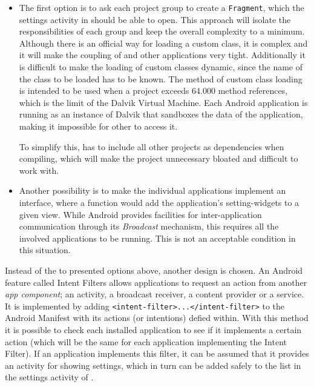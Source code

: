 \begin{itemize}
\item 
The first option is to ask each project group to create a \lstinline|Fragment|, which the settings activity in \launcher should be able to open.
This approach will isolate the responsibilities of each group and keep the overall complexity to a minimum.
Although there is an official way for loading a custom class\cite{customClassLoading}, it is complex and it will make the coupling of \launcher and other applications very tight.
Additionally it is difficult to make the loading of custom classes dynamic, since the name of the class to be loaded has to be known.
The method of custom class loading is intended to be used when a project exceeds 64.000 method references, which is the limit of the Dalvik Virtual Machine.
Each Android application is running as an instance of Dalvik that sandboxes the data of the application, making it impossible for other to access it.

To simplify this, \launcher has to include all other projects as dependencies when compiling, which will make the \launcher project unnecessary bloated and difficult to work with.

\item
Another possibility is to make the individual applications implement an interface, where a function would add the application's setting-widgets to a given view.
While Android provides facilities for inter-application communication through its \textit{Broadcast} mechanism\cite{broadcastReceiver}, this requires all the involved applications to be running.
This is not an acceptable condition in this situation. 
\end{itemize}
 
Instead of the to presented options above, another design is chosen.
An Android feature called Intent Filters allows applications to request an action from another \textit{app component}; an activity, a broadcast receiver, a content provider or a service.
It is implemented by adding \lstinline|<intent-filter>...</intent-filter>| to the Android Manifest with its actions (or intentions) defied within.\cite{intentFilter}
With this method it is possible to check each installed application to see if it implements a certain action (which will be the same for each \giraf application implementing the Intent Filter).
If an application implements this filter, it can be assumed that it provides an activity for showing settings, which in turn can be added safely to the list in the settings activity of \launcher.

